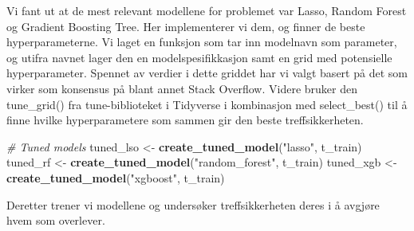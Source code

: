 \documentclass[
]{article}
\newenvironment{Shaded}{\begin{snugshade}}{\end{snugshade}}
\newcommand{\CommentTok}[1]{\textcolor[rgb]{0.56,0.35,0.01}{\textit{#1}}}
\newcommand{\FunctionTok}[1]{\textcolor[rgb]{0.13,0.29,0.53}{\textbf{#1}}}
\newcommand{\NormalTok}[1]{#1}
\newcommand{\OtherTok}[1]{\textcolor[rgb]{0.56,0.35,0.01}{#1}}
\newcommand{\StringTok}[1]{\textcolor[rgb]{0.31,0.60,0.02}{#1}}
\begin{document}
Vi fant ut at de mest relevant modellene for problemet var Lasso, Random
Forest og Gradient Boosting Tree. Her implementerer vi dem, og finner de
beste hyperparameterne. Vi laget en funksjon som tar inn modelnavn som
parameter, og utifra navnet lager den en modelspesifikkasjon samt en
grid med potensielle hyperparameter. Spennet av verdier i dette griddet
har vi valgt basert på det som virker som konsensus på blant annet Stack
Overflow. Videre bruker den tune\_grid() fra tune-biblioteket i
Tidyverse i kombinasjon med select\_best() til å finne hvilke
hyperparametere som sammen gir den beste treffsikkerheten.

\begin{Shaded}
\begin{Highlighting}[]
\CommentTok{\# Tuned models}
\NormalTok{tuned\_lso }\OtherTok{\textless{}{-}} \FunctionTok{create\_tuned\_model}\NormalTok{(}\StringTok{"lasso"}\NormalTok{, t\_train) }
\NormalTok{tuned\_rf }\OtherTok{\textless{}{-}} \FunctionTok{create\_tuned\_model}\NormalTok{(}\StringTok{"random\_forest"}\NormalTok{, t\_train) }
\NormalTok{tuned\_xgb }\OtherTok{\textless{}{-}} \FunctionTok{create\_tuned\_model}\NormalTok{(}\StringTok{"xgboost"}\NormalTok{, t\_train) }
\end{Highlighting}
\end{Shaded}

Deretter trener vi modellene og undersøker treffsikkerheten deres i å
avgjøre hvem som overlever.
\end{document}
